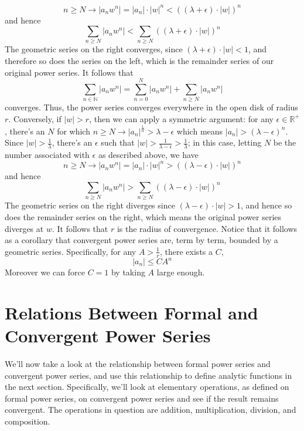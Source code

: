 \documentclass{article}
\newcommand*{\n}{\newline}
\newcommand*{\nn}{\newline \newline}
\newcommand*{\N}{\mathbb{N}}
\newcommand*{\R}{\mathbb{R}}
\begin{document}
    $$ n \geq N \rightarrow | a_n w^n | = | a_n | \cdot | w |^n < ( (\lambda + \epsilon) \cdot | w | )^n $$
and hence
    $$ \sum_{n \geq N} | a_n w^n | < \sum_{n \geq N} ( (\lambda + \epsilon) \cdot | w | )^n $$
The geometric series on the right converges, since $ (\lambda + \epsilon) \cdot | w | < 1 $, and therefore so does the series on the left, which is the remainder series of our original power series. It follows that
    $$ \sum_{n \in \N} | a_n w^n | = \sum_{n = 0}^N | a_n w^n | + \sum_{n \geq N} | a_n w^n | $$
converges. Thus, the power series converges everywhere in the open disk of radius $ r $.
\n
Conversely, if $ | w | > r $, then we can apply a symmetric argument: for any $ \epsilon \in \R^+ $, there's an $ N $ for which $ n \geq N \rightarrow | a_n |^{\frac{1}{n}} > \lambda - \epsilon $ which means $ | a_n | > (\lambda - \epsilon)^n $. Since $ | w | > \frac{1}{\lambda} $, there's an $ \epsilon $ such that $ | w | > \frac{1}{\lambda - \epsilon} > \frac{1}{\lambda} $; in this case, letting $ N $ be the number associated with $ \epsilon $ as described above, we have
    $$ n \geq N \rightarrow | a_n w^n | = | a_n | \cdot | w |^n > ( (\lambda - \epsilon) \cdot | w | )^n $$
and hence
    $$ \sum_{n \geq N} | a_n w^n | > \sum_{n \geq N} ( (\lambda - \epsilon) \cdot | w | )^n $$
The geometric series on the right diverges since $ (\lambda - \epsilon) \cdot | w | > 1 $, and hence so does the remainder series on the right, which means the original power series diverges at $ w $. It follows that $ r $ is the radius of convergence. \qedsymbol
\nn
Notice that it follows as a corollary that convergent power series are, term by term, bounded by a geometric series. Specifically, for any $ A > \frac{1}{r} $, there exists a $ C $,
    $$ | a_n | \leq C A^n $$
Moreover we can force $ C =  1 $ by taking $ A $ large enough.

\section{Relations Between Formal and Convergent Power Series}
We'll now take a look at the relationship between formal power series and convergent power series, and use this relationship to define analytic functions in the next section. Specifically, we'll look at elementary operations, as defined on formal power series, on convergent power series and see if the result remains convergent. The operations in question are addition, multiplication, division, and composition.
\end{document}
